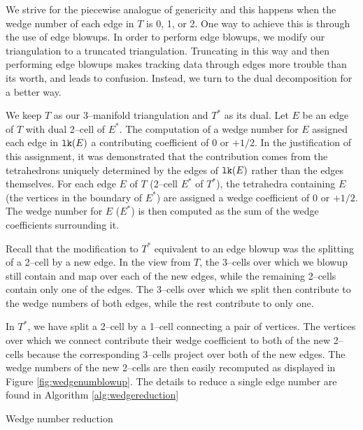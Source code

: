 We strive for the piecewise analogue of genericity and this happens when the wedge number of each edge in $T$ is 0, 1, or 2.
One way to achieve this is through the use of edge blowups.
In order to perform edge blowups, we modify our triangulation to a truncated triangulation.
Truncating in this way and then performing edge blowups makes tracking data through edges more trouble than its worth, and leads to confusion.
Instead, we turn to the dual decomposition for a better way.

We keep $T$ as our 3--manifold triangulation and $T^*$ as its dual.
Let $E$ be an edge of $T$ with dual 2--cell of $E^*$.
The computation of a wedge number for $E$ assigned each edge in $\texttt{lk}(E)$ a contributing coefficient of $0$ or $+1/2$.
In the justification of this assignment, it was demonstrated that the contribution comes from the tetrahedrons uniquely determined by the edges of $\texttt{lk}(E)$ rather than the edges themselves.
For each edge $E$ of $T$ (2--cell $E^*$ of $T^*$), the tetrahedra containing $E$ (the vertices in the boundary of $E^*$) are assigned a wedge coefficient of 0 or $+1/2$.
The wedge number for $E$ ($E^*$) is then computed as the sum of the wedge coefficients surrounding it.

Recall that the modification to $T^*$ equivalent to an edge blowup was the splitting of a 2--cell by a new edge.
In the view from $T$, the 3--cells over which we blowup still contain and map over each of the new edges, while the remaining 2--cells contain only one of the edges.
The 3--cells over which we split then contribute to the wedge numbers of both edges, while the rest contribute to only one.

In $T^*$, we have split a 2--cell by a 1--cell connecting a pair of vertices.
The vertices over which we connect contribute their wedge coefficient to both of the new 2--cells because the corresponding 3--cells project over both of the new edges.
The wedge numbers of the new 2--cells are then easily recomputed as displayed in Figure \ref{fig:wedgenumblowup}.
The details to reduce a single edge number are found in Algorithm \ref{alg:wedgereduction}

\begin{algorithm}[h]
	\caption{Wedge number reduction}
	\label{alg:wedgereduction}
\end{algorithm}

